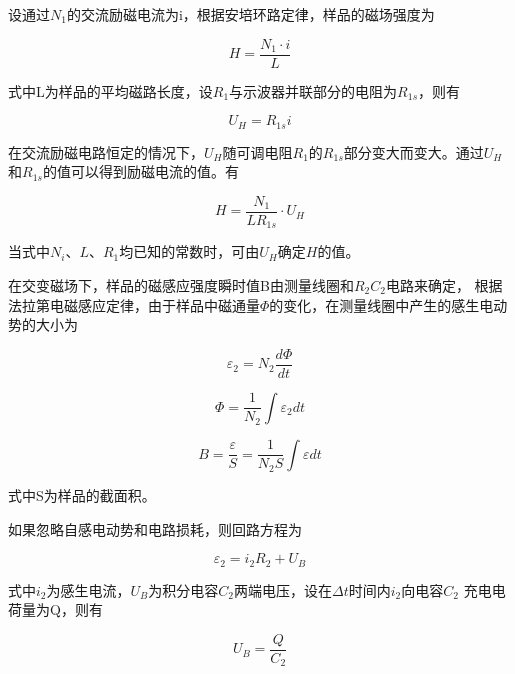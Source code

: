 \documentclass{ctexart}
\begin{document}
  设通过$N_{1}$的交流励磁电流为i，根据安培环路定律，样品的磁场强度为
  
  \begin{equation}
    H=\frac{N_{1} \cdot i}{L}
  \end{equation}

  式中L为样品的平均磁路长度，设$R_{1}$与示波器并联部分的电阻为$R_{1s}$，则有

  \begin{equation}
    U_{H}=R_{1s}i
  \end{equation}

  在交流励磁电路恒定的情况下，$U_{H}$随可调电阻$R_{1}$的$R_{1s}$部分变大而变大。通过$U_{H}$和$R_{1s}$的值可以得到励磁电流的值。有

  \begin{equation}
    H=\frac{N_{1}}{LR_{1s}} \cdot U_{H}
  \end{equation}

  当式中$N_{i}$、$L$、$R_{1}$均已知的常数时，可由$U_{H}$确定$H$的值。

  在交变磁场下，样品的磁感应强度瞬时值B由测量线圈和$R_{2}C_{2}$电路来确定，
  根据法拉第电磁感应定律，由于样品中磁通量$\Phi$的变化，在测量线圈中产生的感生电动势的大小为
  
  \begin{equation}
    \varepsilon_{2} = N_{2} \frac{d\Phi}{dt}
  \end{equation}

  \begin{equation}
    \Phi = \frac{1}{N_{2}} \int \varepsilon_{2}dt 
  \end{equation}

  \begin{equation}
    B=\frac{\varepsilon}{S}=\frac{1}{N_{2}S} \int \varepsilon dt
  \end{equation}

  式中S为样品的截面积。

  如果忽略自感电动势和电路损耗，则回路方程为
  
  \begin{equation}
    \varepsilon_{2} = i_{2} R_{2} + U_{B}
  \end{equation}

  式中$i_{2}$为感生电流，$U_{B}$为积分电容$C_{2}$两端电压，设在$\Delta t$时间内$i_{2}$向电容$C_{2}$
  充电电荷量为Q，则有

  \begin{equation}
    U_{B}=\frac{Q}{C_{2}}
  \end{equation}
\end{document}
